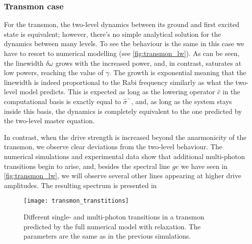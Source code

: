 \subsubsection{Transmon case}

For the transmon, the two-level dynamics between its ground and first excited state is equivalent; however, there's no simple analytical solution for the dynamics between many levels. To see the behaviour is the same in this case we have to resort to numerical modelling (see \autoref{fig:transmon_lw}). As can be seen, the linewidth $\delta\omega$ grows with the increased power, and, in contrast, saturates at low powers, reaching the value of $\gamma$. The growth is exponential meaning that the linewidth is indeed proportional to the Rabi frequency similarly as what the two-level model predicts. This is expected as long as the lowering operator $\hat c$ in the computational basis is exactly equal to $\hat \sigma^-$, and, as long as the system stays inside this basis, the dynamics is completely equivalent to the one predicted by the two-level master equation. 

In contrast, when the drive strength is increased beyond the anarmonicity of the transmon, we observe clear deviations from the two-level behaviour. The numerical simulations and experimental data show that additional multi-photon transitions begin to arise, and, besides the spectral line $ge$ we have seen in \autoref{fig:transmon_lw}, we will observe several other lines appearing at higher drive amplitudes. The resulting spectrum is presented in  

\begin{figure}
\centering
\texttt{[image: transmon\_transtitions]}
\caption{Different single- and multi-photon transitions in a transmon predicted by the full numerical model with relaxation. The parameters are the same as in the previous simulations.}
\label{fig:transmon_transitions}
\end{figure}